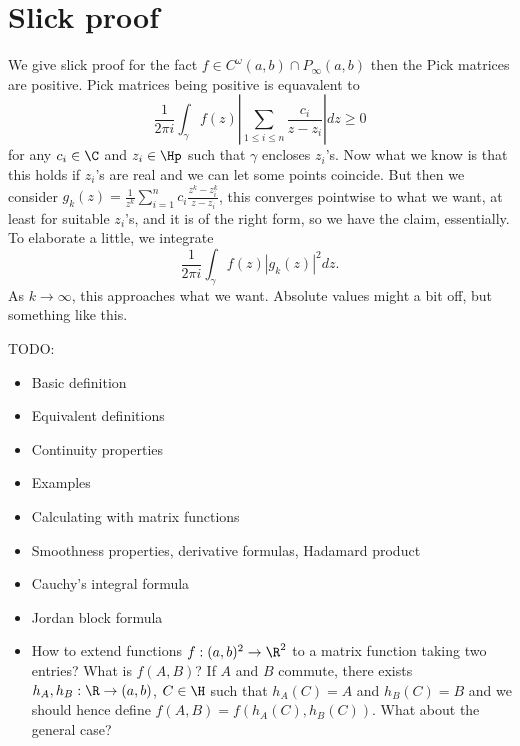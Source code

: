 \section{Slick proof}

We give slick proof for the fact $f \in C^{\omega}(a, b) \cap P_{\infty}(a, b)$ then the Pick matrices are positive. Pick matrices being positive is equavalent to
\[
	\frac{1}{2 \pi i}\int_{\gamma} f(z) \left|\sum_{1 \leq i \leq n}\frac{c_{i}}{z - z_{i}} \right| d z \geq 0
\]
for any $c_{i} \in \C$ and $z_{i} \in \Hp$ such that $\gamma$ encloses $z_{i}$'s. Now what we know is that this holds if $z_{i}$'s are real and we can let some points coincide. But then we consider $g_{k}(z) = \frac{1}{z^{k}}\sum_{i = 1}^{n} c_{i} \frac{z^{k} - z_{i}^{k}}{z - z_{i}}$, this converges pointwise to what we want, at least for suitable $z_{i}$'s, and it is of the right form, so we have the claim, essentially. To elaborate a little, we integrate
\[
	\frac{1}{2 \pi i}\int_{\gamma} f(z) |g_{k}(z)|^{2} dz.
\]
As $k \to \infty$, this approaches what we want. Absolute values might a bit off, but something like this.


TODO:
\begin{itemize}
	\item Basic definition
	\item Equivalent definitions
	\item Continuity properties
	\item Examples
	\item Calculating with matrix functions
	\item Smoothness properties, derivative formulas, Hadamard product
	\item Cauchy's integral formula
	\item Jordan block formula
	\item How to extend functions $f : (a, b)^2 \to \R^{2}$ to a matrix function taking two entries? What is $f(A, B)$? If $A$ and $B$ commute, there exists $h_{A}, h_{B} : \R \to (a, b)$, $C \in \H$ such that $h_{A}(C) = A$ and $h_{B}(C) = B$ and we should hence define $f(A, B) = f(h_{A}(C), h_{B}(C))$. What about the general case?
\end{itemize}
